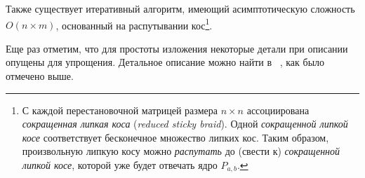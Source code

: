 

Также существует итеративный алгоритм, имеющий асимптотическую сложность $O(n \times m)$, основанный на распутывании кос\footnote{С каждой перестановочной матрицей размера $n \times n$ ассоциирована \emph{сокращенная липкая коса} (\emph{reduced sticky braid}). Одной \emph{сокращенной липкой косе} соответствует бесконечное множество липких кос. Таким образом, произвольную липкую косу можно  \emph{распутать} до  (свести к) \emph{сокращенной липкой косе}, которой уже будет отвечать ядро $P_{a,b}$.
}.






Еще раз отметим, что для простоты изложения некоторые детали при описании опущены для упрощения. Детальное описание можно найти в ~\cite{alex2007semilocal}, как было отмечено выше.

